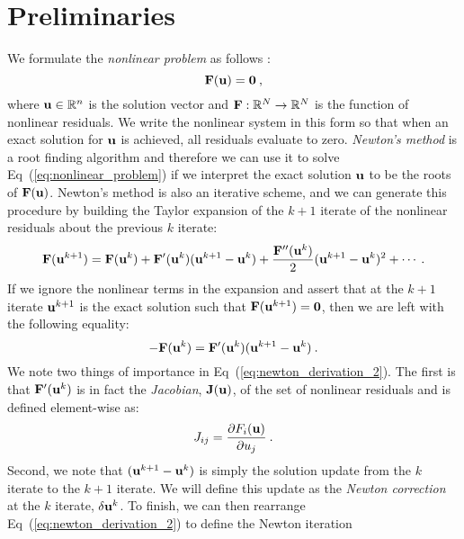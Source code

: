 \section{Preliminaries}
\label{sec:nonlinear_preliminaries}
We formulate the \textit{nonlinear problem} as follows
\citep{knoll_jacobian-free_2004}:
\begin{equation}
  \mathbf{F}(\mathbf{u}) = \mathbf{0}\:,
  \label{eq:nonlinear_problem}
\end{equation}
where $\mathbf{u} \in \mathbb{R}^n$ is the solution vector and
$\mathbf{F}:\mathbb{R}^N \rightarrow \mathbb{R}^N$ is the function of
nonlinear residuals. We write the nonlinear system in this form so
that when an exact solution for $\mathbf{u}$ is achieved, all residuals
evaluate to zero. \textit{Newton's method} is a root finding algorithm
and therefore we can use it to solve Eq~(\ref{eq:nonlinear_problem})
if we interpret the exact solution $\mathbf{u}$ to be the roots of
$\mathbf{F}(\mathbf{u})$. Newton's method is also an iterative scheme, and we
can generate this procedure by building the Taylor expansion of the
$k+1$ iterate of the nonlinear residuals about the previous $k$
iterate:
\begin{equation}
  \mathbf{F}(\mathbf{u}^{k+1}) = \mathbf{F}(\mathbf{u}^{k}) +
  \mathbf{F}'(\mathbf{u}^{k})(\mathbf{u}^{k+1}-\mathbf{u}^{k}) +
  \frac{\mathbf{F}''(\mathbf{u}^{k})}{2}(\mathbf{u}^{k+1}-\mathbf{u}^{k})^2 + \cdots
  \:.
  \label{eq:newton_derivation_1}
\end{equation}
If we ignore the nonlinear terms in the expansion and assert that at
the $k+1$ iterate $\mathbf{u}^{k+1}$ is the exact solution such that
$\mathbf{F}(\mathbf{u}^{k+1}) = \mathbf{0}$, then we are left with the following
equality:
\begin{equation}
  -\mathbf{F}(\mathbf{u}^{k}) =
  \mathbf{F}'(\mathbf{u}^{k})(\mathbf{u}^{k+1}-\mathbf{u}^{k})\:.
  \label{eq:newton_derivation_2}
\end{equation}
We note two things of importance in
Eq~(\ref{eq:newton_derivation_2}). The first is that
$\mathbf{F}'(\mathbf{u}^{k})$ is in fact the \textit{Jacobian},
$\mathbf{J}(\mathbf{u})$, of the set of nonlinear residuals and is defined
element-wise as:
\begin{equation}
  J_{ij} = \frac{\partial F_i(\mathbf{u})}{\partial u_j}\:.
  \label{eq:jacobian_def}
\end{equation}
Second, we note that $(\mathbf{u}^{k+1}-\mathbf{u}^{k})$ is simply the
solution update from the $k$ iterate to the $k+1$ iterate. We will
define this update as the \textit{Newton correction} at the $k$
iterate, $\delta \mathbf{u}^k$. To finish, we can then rearrange
Eq~(\ref{eq:newton_derivation_2}) to define the Newton iteration
